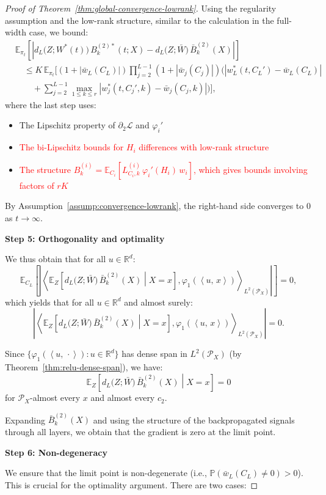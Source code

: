 \documentclass[11pt]{article}
\newcommand{\E}{\mathbb{E}}
\newcommand{\Pp}{\mathbb{P}}
\newcommand{\R}{\mathbb{R}}
\newcommand{\1}{\mathbbm{1}}
\newcommand{\ip}[2]{\left\langle #1,\,#2 \right\rangle}
\begin{document}
\begin{proof}[Proof of Theorem~\ref{thm:global-convergence-lowrank}]
Using the regularity assumption and the low-rank structure, similar to the calculation in the full-width case, we bound:
\begin{align*}
&\E_{\pi_t}\left[\left|d_L\big(Z;W^*(t)\big)\,B_k^{(2)*}(t;X)-d_L\big(Z;\bar{W}\big)\,\bar{B}_k^{(2)}(X)\right|\right]\\
&\quad \le K\,\E_{\pi_t}\Big[(1+|\bar{w}_L(C_L)|)\prod_{j=2}^{L-1}(1+|\bar{w}_j(C_j)|)\Big(|w_L^*(t,C_L')-\bar{w}_L(C_L)|\\
&\qquad + \sum_{j=2}^{L-1}\max_{1\le k\le r}|w_j^*(t,C_j',k)-\bar{w}_j(C_j,k)|\Big)\Big],
\end{align*}
where the last step uses:
\begin{itemize}
\item The Lipschitz property of $\partial_2\mathcal{L}$ and $\varphi_i'$
\item \textcolor{red}{The bi-Lipschitz bounds for $H_i$ differences with low-rank structure}
\item \textcolor{red}{The structure $B_k^{(i)} = \E_{C_i}[L^{(i)}_{C_i,k}\,\varphi_i'(H_i)\,w_i]$, which gives bounds involving factors of $rK$}
\end{itemize}

By Assumption~\ref{assump:convergence-lowrank}, the right-hand side converges to $0$ as $t\to\infty$.

\textbf{Step 5: Orthogonality and optimality}

We thus obtain that for all $u\in\R^d$:
\[
\E_{C_L}\left[\left|\left\langle \E_{Z}\!\left[d_L\big(Z;\bar{W}\big)\,\bar{B}_k^{(2)}(X)\middle|X=x\right],\varphi_1(\ip{u}{x})\right\rangle_{L^2(\mathcal{P}_X)}\right|\right] = 0,
\]
which yields that for all $u\in\R^d$ and almost surely:
\[
\left|\left\langle \E_{Z}\!\left[d_L\big(Z;\bar{W}\big)\,\bar{B}_k^{(2)}(X)\middle|X=x\right],\varphi_1(\ip{u}{x})\right\rangle_{L^2(\mathcal{P}_X)}\right| = 0.
\]

Since $\{\varphi_1(\ip{u}{\cdot}): u\in\R^d\}$ has dense span in $L^2(\mathcal{P}_X)$ (by Theorem~\ref{thm:relu-dense-span}), we have:
\[
\E_{Z}\!\left[d_L\big(Z;\bar{W}\big)\,\bar{B}_k^{(2)}(X)\middle|X=x\right] = 0
\]
for $\mathcal{P}_X$-almost every $x$ and almost every $c_2$.

Expanding $\bar{B}_k^{(2)}(X)$ and using the structure of the backpropagated signals through all layers, we obtain that the gradient is zero at the limit point.

\textbf{Step 6: Non-degeneracy}

We ensure that the limit point is non-degenerate (i.e., $\Pp(\bar{w}_L(C_L) \ne 0) > 0$). This is crucial for the optimality argument. There are two cases:


\end{proof}
\end{document}
